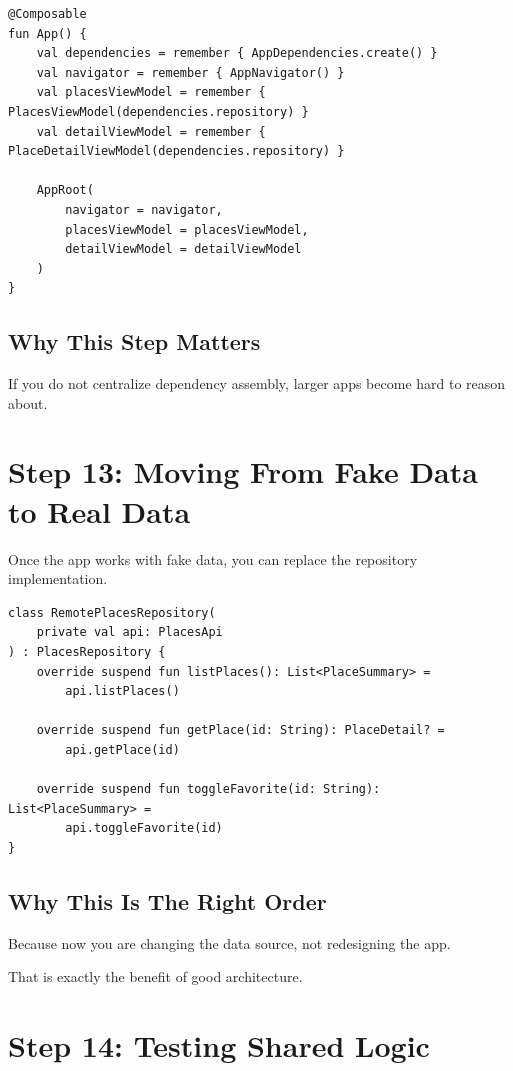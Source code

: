 \documentclass[11pt,a4paper]{article}
\begin{document}
\begin{lstlisting}[style=kazekotlin]
@Composable
fun App() {
    val dependencies = remember { AppDependencies.create() }
    val navigator = remember { AppNavigator() }
    val placesViewModel = remember { PlacesViewModel(dependencies.repository) }
    val detailViewModel = remember { PlaceDetailViewModel(dependencies.repository) }

    AppRoot(
        navigator = navigator,
        placesViewModel = placesViewModel,
        detailViewModel = detailViewModel
    )
}
\end{lstlisting}

\subsection{Why This Step Matters}

If you do not centralize dependency assembly, larger apps become hard to reason about.

\section{Step 13: Moving From Fake Data to Real Data}

Once the app works with fake data, you can replace the repository implementation.

\begin{lstlisting}[style=kazekotlin]
class RemotePlacesRepository(
    private val api: PlacesApi
) : PlacesRepository {
    override suspend fun listPlaces(): List<PlaceSummary> =
        api.listPlaces()

    override suspend fun getPlace(id: String): PlaceDetail? =
        api.getPlace(id)

    override suspend fun toggleFavorite(id: String): List<PlaceSummary> =
        api.toggleFavorite(id)
}
\end{lstlisting}

\subsection{Why This Is The Right Order}

Because now you are changing the data source, not redesigning the app.

That is exactly the benefit of good architecture.

\section{Step 14: Testing Shared Logic}
\end{document}
